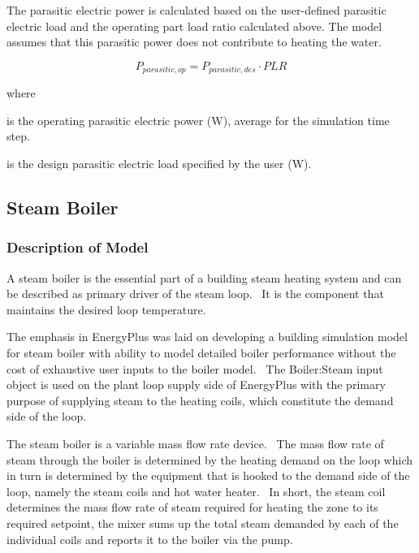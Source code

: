 The parasitic electric power is calculated based on the user-defined parasitic electric load and the operating part load ratio calculated above. The model assumes that this parasitic power does not contribute to heating the water.

\begin{equation}
P_{parasitic, op} = P_{parasitic, des} \cdot PLR
\end{equation}

\noindent where
\begin{description}[labelwidth=1cm, leftmargin=!]
\item[$P_{parasitic, op}$] is the operating parasitic electric power (W), average for the simulation time step.
\item[$P_{parasitic, des}$] is the design parasitic electric load specified by the user (W).
\end{description}

\subsection{Steam Boiler}\label{steam-boiler}

\subsubsection{Description of Model}\label{description-of-model}

A steam boiler is the essential part of a building steam heating system and can be described as primary driver of the steam loop.~ It is the component that maintains the desired loop temperature.

The emphasis in EnergyPlus was laid on developing a building simulation model for steam boiler with ability to model detailed boiler performance without the cost of exhaustive user inputs to the boiler model.~ The Boiler:Steam input object is used on the plant loop supply side of EnergyPlus with the primary purpose of supplying steam to the heating coils, which constitute the demand side of the loop.

The steam boiler is a variable mass flow rate device.~ The mass flow rate of steam through the boiler is determined by the heating demand on the loop which in turn is determined by the equipment that is hooked to the demand side of the loop, namely the steam coils and hot water heater.~ In short, the steam coil determines the mass flow rate of steam required for heating the zone to its required setpoint, the mixer sums up the total steam demanded by each of the individual coils and reports it to the boiler via the pump.

